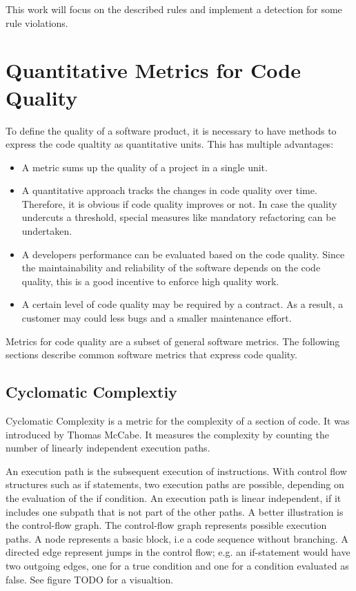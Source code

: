 This work will focus on the described rules and implement a detection for some rule violations.

\section{Quantitative Metrics for Code Quality}
To define the quality of a software product, it is necessary to have methods to express the code qualtity as quantitative units. This has multiple advantages:
\begin{itemize}
    \item A metric sums up the quality of a project in a single unit.
    \item A quantitative approach tracks the changes in code quality over time. Therefore, it is obvious if code quality improves or not. In case the quality  undercuts a threshold, special measures like mandatory refactoring can be undertaken.
    \item A developers performance can be evaluated  based on the code quality. Since the maintainability and reliability of the software depends on the code quality, this is a good incentive to enforce high quality work.
    \item A certain level of code quality may be required by a contract. As a result, a customer may could less bugs and a smaller maintenance effort.
\end{itemize}
Metrics for code quality are a subset of general software metrics. The following sections describe common software metrics that express code quality.

\subsection{Cyclomatic Complextiy}\label{sec:cyclomatic_complexity}
Cyclomatic Complexity is a metric for the complexity of a section of code. It was introduced by Thomas McCabe. It measures the complexity by counting the number of linearly independent execution paths\cite{mccabe_complexity_1976}. 

An execution path is the subsequent execution of instructions. With control flow structures such as if statements, two execution paths are possible, depending on the evaluation of the if condition. An execution path is linear independent, if it includes one subpath that is not part of the other paths. A better illustration is the control-flow graph. The control-flow graph represents possible execution paths. A node represents  a basic block, i.e a code sequence without branching. A directed edge represent jumps in the control flow; e.g. an if-statement would have two outgoing edges, one for a true condition and one for a condition evaluated as false. See figure TODO for a visualtion.

